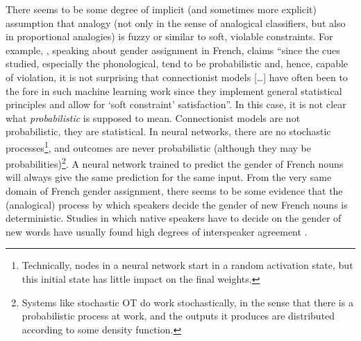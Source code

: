 There seems to be some degree of implicit (and sometimes more explicit) assumption that analogy (not only in the sense of analogical classifiers, but also in proportional analogies) is fuzzy or similar to soft, violable constraints. For example, \textcite[880]{Matthews.2010}, speaking about gender assignment in French, claims ``since the cues studied, especially the phonological, tend to be probabilistic and, hence, capable of violation, it is not surprising that connectionist models [\dots] have often been to the fore in such machine learning work since they implement general statistical principles and allow for `soft constraint' satisfaction''. In this case, it is not clear what \textit{probabilistic} is supposed to mean. Connectionist models are not probabilistic, they are statistical. In neural networks, there are no stochastic processes\footnote{Technically, nodes in a neural network start in a random activation state, but this initial state has little impact on the final weights.}, and outcomes are never probabilistic (although they may be probabilities)\footnote{Systems like stochastic OT \autocites{Boersma.1997, Boersma.1998, Boersma.2001} do work stochastically, in the sense that there is a probabilistic process at work, and the outputs it produces are distributed according to some density function.}. A neural network trained to predict the gender of French nouns will always give the same prediction for the same input. From the very same domain of French gender assignment, there seems to be some evidence that the (analogical) process by which speakers decide the gender of new French nouns is deterministic. Studies in which native speakers have to decide on the gender of new words have usually found high degrees of interspeaker agreement \autocites{Tucker.1968, Tucker.1977, Holmes.1999}.

